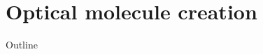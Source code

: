 \documentclass{beamer}
\begin{document}

\begin{frame}{}
\end{frame}


\section{Optical molecule creation}
\begin{frame}{Outline}
  \tableofcontents[currentsection]
\end{frame}
\end{document}
